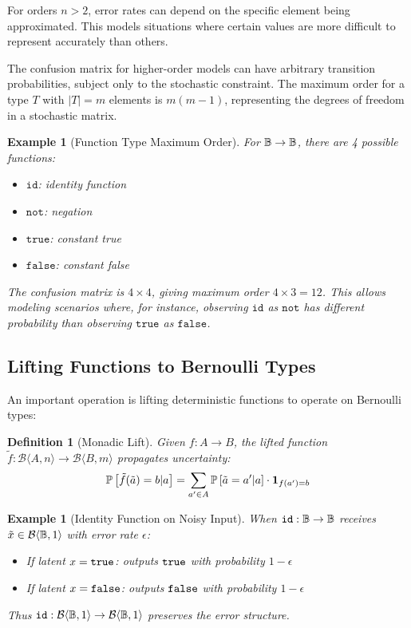\documentclass[11pt,final,hidelinks]{article}
\newtheorem{definition}[theorem]{Definition}
\newtheorem{example}[theorem]{Example}
\newcommand{\bernoulli}[2]{\mathcal{B}\langle #1, #2 \rangle}
\begin{document}
For orders $n > 2$, error rates can depend on the specific element being approximated. This models situations where certain values are more difficult to represent accurately than others.

The confusion matrix for higher-order models can have arbitrary transition probabilities, subject only to the stochastic constraint. The maximum order for a type $T$ with $|T| = m$ elements is $m(m-1)$, representing the degrees of freedom in a stochastic matrix.

\begin{example}[Function Type Maximum Order]
For $\mathbb{B} \to \mathbb{B}$, there are 4 possible functions:
\begin{itemize}
    \item $\mathtt{id}$: identity function  
    \item $\mathtt{not}$: negation
    \item $\mathtt{true}$: constant true
    \item $\mathtt{false}$: constant false
\end{itemize}
The confusion matrix is $4 \times 4$, giving maximum order $4 \times 3 = 12$. This allows modeling scenarios where, for instance, observing $\mathtt{id}$ as $\mathtt{not}$ has different probability than observing $\mathtt{true}$ as $\mathtt{false}$.
\end{example}

\subsection{Lifting Functions to Bernoulli Types}

An important operation is lifting deterministic functions to operate on Bernoulli types:

\begin{definition}[Monadic Lift]
Given $f: A \to B$, the lifted function $\tilde{f}: \bernoulli{A}{n} \to \bernoulli{B}{m}$ propagates uncertainty:
\begin{equation}
\mathbb{P}\left[\tilde{f}(\tilde{a}) = b | a\right] = \sum_{a' \in A} \mathbb{P}\left[\tilde{a} = a' | a\right] \cdot \mathbf{1}_{f(a') = b}
\end{equation}
\end{definition}

\begin{example}[Identity Function on Noisy Input]
When $\mathtt{id}: \mathbb{B} \to \mathbb{B}$ receives $\tilde{x} \in \bernoulli{\Bool}{1}$ with error rate $\epsilon$:
\begin{itemize}
    \item If latent $x = \mathtt{true}$: outputs $\mathtt{true}$ with probability $1-\epsilon$
    \item If latent $x = \mathtt{false}$: outputs $\mathtt{false}$ with probability $1-\epsilon$
\end{itemize}
Thus $\mathtt{id}: \bernoulli{\Bool}{1} \to \bernoulli{\Bool}{1}$ preserves the error structure.
\end{example}
\end{document}
